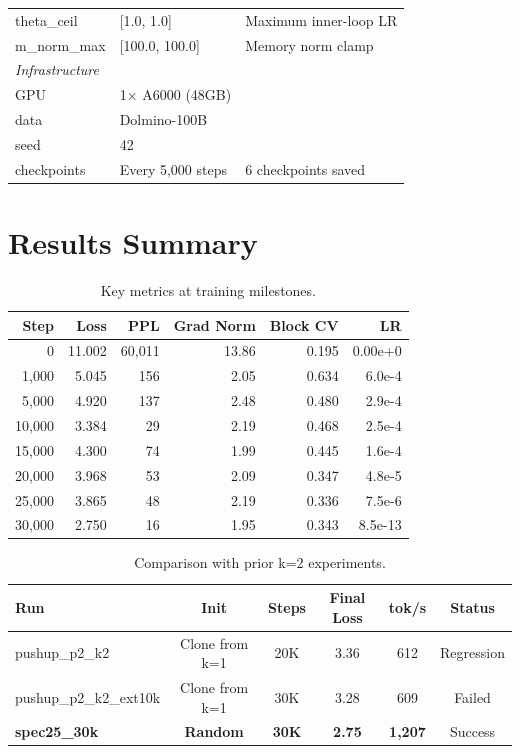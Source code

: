 \documentclass[11pt,a4paper]{article}
\begin{document}
\begin{table}[H]
\begin{tabular}{lll}
\quad theta\_ceil & [1.0, 1.0] & Maximum inner-loop LR \\
\quad m\_norm\_max & [100.0, 100.0] & Memory norm clamp \\
\midrule
\multicolumn{3}{l}{\textit{Infrastructure}} \\
\quad GPU & 1$\times$ A6000 (48GB) & \\
\quad data & Dolmino-100B & \\
\quad seed & 42 & \\
\quad checkpoints & Every 5,000 steps & 6 checkpoints saved \\
\bottomrule
\end{tabular}
\end{table}

\section{Results Summary}

\begin{table}[H]
\centering
\caption{Key metrics at training milestones.}
\begin{tabular}{rrrrrr}
\toprule
\textbf{Step} & \textbf{Loss} & \textbf{PPL} & \textbf{Grad Norm} & \textbf{Block CV} & \textbf{LR} \\
\midrule
0      & 11.002 & 60,011 & 13.86 & 0.195 & 0.00e+0 \\
1,000  &  5.045 &    156 &  2.05 & 0.634 & 6.0e-4 \\
5,000  &  4.920 &    137 &  2.48 & 0.480 & 2.9e-4 \\
10,000 &  3.384 &     29 &  2.19 & 0.468 & 2.5e-4 \\
15,000 &  4.300 &     74 &  1.99 & 0.445 & 1.6e-4 \\
20,000 &  3.968 &     53 &  2.09 & 0.347 & 4.8e-5 \\
25,000 &  3.865 &     48 &  2.19 & 0.336 & 7.5e-6 \\
30,000 &  2.750 &     16 &  1.95 & 0.343 & 8.5e-13 \\
\bottomrule
\end{tabular}
\end{table}

\begin{table}[H]
\centering
\caption{Comparison with prior k=2 experiments.}
\begin{tabular}{lccccc}
\toprule
\textbf{Run} & \textbf{Init} & \textbf{Steps} & \textbf{Final Loss} & \textbf{tok/s} & \textbf{Status} \\
\midrule
pushup\_p2\_k2         & Clone from k=1 & 20K & 3.36 & 612 & \textcolor{danger}{Regression} \\
pushup\_p2\_k2\_ext10k & Clone from k=1 & 30K & 3.28 & 609 & \textcolor{danger}{Failed} \\
\textbf{spec25\_30k}   & \textbf{Random} & \textbf{30K} & \textbf{2.75} & \textbf{1,207} & \textcolor{healthy}{Success} \\
\bottomrule
\end{tabular}
\end{table}
\end{document}
